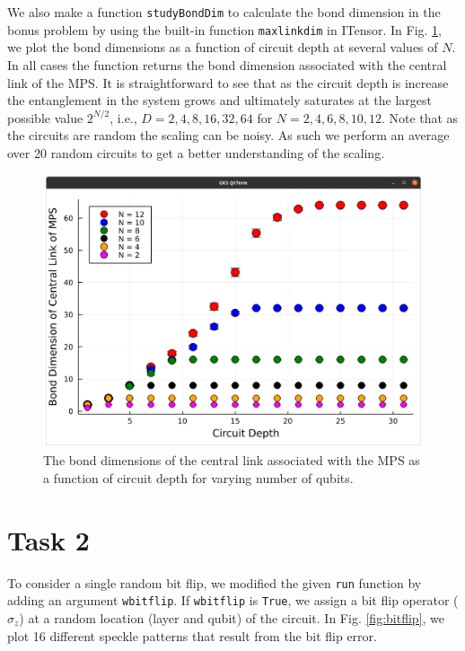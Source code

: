 \documentclass[12pt]{article}
\begin{document}
We also make a function \texttt{studyBondDim} to calculate the bond dimension in the bonus problem by using the built-in function \texttt{maxlinkdim} in ITensor. In Fig. \ref{fig:bonddim}, we plot the bond dimensions as a function of circuit depth at several values of $N$. In all cases the function returns the bond dimension associated with the central link of the MPS. It is straightforward to see that as the circuit depth is increase the entanglement in the system grows and ultimately saturates at the largest possible value $2^{N/2}$, i.e., $D = 2, 4, 8, 16, 32, 64$ for $N = 2, 4, 6, 8, 10 ,12$. Note that as the circuits are random the scaling can be noisy. As such we perform an average over 20 random circuits to get a better understanding of the scaling. 

\begin{figure}
	\centering
	\includegraphics [width=0.8\linewidth] {figures/Task1b}
	\caption{
		The bond dimensions of the central link associated with the MPS as a function of circuit depth for varying number of qubits.}
	\label{fig:bonddim}
\end{figure}


\section*{Task 2}

To consider a single random bit flip, we modified the given \texttt{run} function by adding an argument \texttt{wbitflip}. If \texttt{wbitflip} is \texttt{True}, we assign a bit flip operator ($\hat{\sigma}_z$) at a random location (layer and qubit) of the circuit. In Fig. \ref{fig:bitflip}, we plot 16 different speckle patterns that result from the bit flip error.
\end{document}
